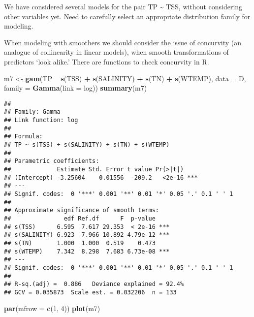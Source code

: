 \documentclass[
]{book}
\newenvironment{Shaded}{\begin{snugshade}}{\end{snugshade}}
\newcommand{\DataTypeTok}[1]{\textcolor[rgb]{0.13,0.29,0.53}{#1}}
\newcommand{\DecValTok}[1]{\textcolor[rgb]{0.00,0.00,0.81}{#1}}
\newcommand{\KeywordTok}[1]{\textcolor[rgb]{0.13,0.29,0.53}{\textbf{#1}}}
\newcommand{\NormalTok}[1]{#1}
\newcommand{\OperatorTok}[1]{\textcolor[rgb]{0.81,0.36,0.00}{\textbf{#1}}}
\newcommand{\StringTok}[1]{\textcolor[rgb]{0.31,0.60,0.02}{#1}}
\begin{document}
We have considered several models for the pair TP \textasciitilde{} TSS, without considering other variables yet. Need to carefully select an appropriate distribution family for modeling.

When modeling with smoothers we should consider the issue of concurvity (an analogue of collinearity in linear models), when smooth transformations of predictors `look alike.' There are functions to check concurvity in R.

\begin{Shaded}
\begin{Highlighting}[]
\NormalTok{m7 <-}\StringTok{ }\KeywordTok{gam}\NormalTok{(TP }\OperatorTok{~}\StringTok{ }\KeywordTok{s}\NormalTok{(TSS) }\OperatorTok{+}\StringTok{ }\KeywordTok{s}\NormalTok{(SALINITY) }\OperatorTok{+}\StringTok{ }\KeywordTok{s}\NormalTok{(TN) }\OperatorTok{+}\StringTok{ }\KeywordTok{s}\NormalTok{(WTEMP), }
          \DataTypeTok{data =}\NormalTok{ D, }\DataTypeTok{family =} \KeywordTok{Gamma}\NormalTok{(}\DataTypeTok{link =}\NormalTok{ log))}
\KeywordTok{summary}\NormalTok{(m7)}
\end{Highlighting}
\end{Shaded}

\begin{verbatim}
## 
## Family: Gamma 
## Link function: log 
## 
## Formula:
## TP ~ s(TSS) + s(SALINITY) + s(TN) + s(WTEMP)
## 
## Parametric coefficients:
##             Estimate Std. Error t value Pr(>|t|)    
## (Intercept) -3.25604    0.01556  -209.2   <2e-16 ***
## ---
## Signif. codes:  0 '***' 0.001 '**' 0.01 '*' 0.05 '.' 0.1 ' ' 1
## 
## Approximate significance of smooth terms:
##               edf Ref.df      F  p-value    
## s(TSS)      6.595  7.617 29.353  < 2e-16 ***
## s(SALINITY) 6.923  7.966 10.892 4.79e-12 ***
## s(TN)       1.000  1.000  0.519    0.473    
## s(WTEMP)    7.342  8.298  7.683 6.73e-08 ***
## ---
## Signif. codes:  0 '***' 0.001 '**' 0.01 '*' 0.05 '.' 0.1 ' ' 1
## 
## R-sq.(adj) =  0.886   Deviance explained = 92.4%
## GCV = 0.035873  Scale est. = 0.032206  n = 133
\end{verbatim}

\begin{Shaded}
\begin{Highlighting}[]
\KeywordTok{par}\NormalTok{(}\DataTypeTok{mfrow =} \KeywordTok{c}\NormalTok{(}\DecValTok{1}\NormalTok{, }\DecValTok{4}\NormalTok{))}
\KeywordTok{plot}\NormalTok{(m7)}
\end{Highlighting}
\end{Shaded}
\end{document}
